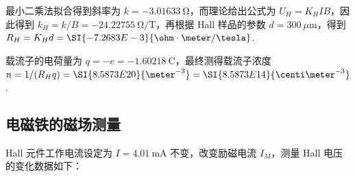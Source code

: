 \documentclass{customDoc}
\begin{document}
\vspace{-20pt}

最小二乘法拟合得到斜率为 $k = \SI{-3.01633}{\ohm}$，而理论给出公式为 $U_H = K_HIB$，因此得到 $k_H = k/B = \SI{-24.22755}{\ohm/\tesla}$，再根据 Hall 样品的参数 $d = \SI{300}{\mu\meter}$，得到 $R_H = K_Hd = \SI{-7.2683E-3}{\ohm\cdot\meter/\tesla}$.

载流子的电荷量为 $q = -e = \SI{-1.60218}{\coulomb}$，最终测得载流子浓度 $n = 1/(R_Hq) = \SI{8.5873E20}{\meter^{-3}} = \SI{8.5873E14}{\centi\meter^{-3}}$.

\subsection{电磁铁的磁场测量}

Hall 元件工作电流设定为 $I = \SI{4.01}{\milli\ampere}$ 不变，改变励磁电流 $I_M$，测量 Hall 电压的变化数据如下：
\end{document}
